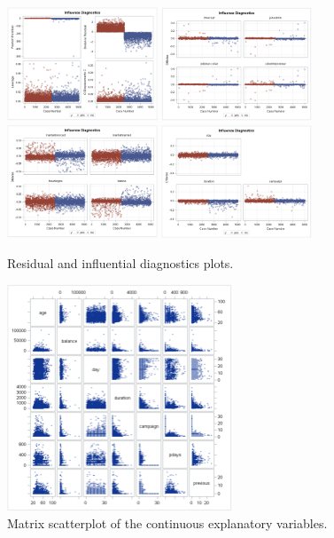 \documentclass[]{article}
\begin{document}
\begin{figure}
  \centering
    \includegraphics[width=0.4\textwidth]{images/fig16_residual_1.png}
    \includegraphics[width=0.4\textwidth]{images/fig16_residual_2.png}
    \includegraphics[width=0.4\textwidth]{images/fig16_residual_3.png}
    \includegraphics[width=0.4\textwidth]{images/fig16_residual_4.png}
  \caption{Residual and influential diagnostics plots.}
  \label{fig16}
\end{figure}

\begin{figure}
  \centering
    \includegraphics[width=0.6\textwidth]{images/fig17_scatter.png}
  \caption{Matrix scatterplot of the continuous explanatory variables.}
  \label{fig17}
\end{figure}
\end{document}
